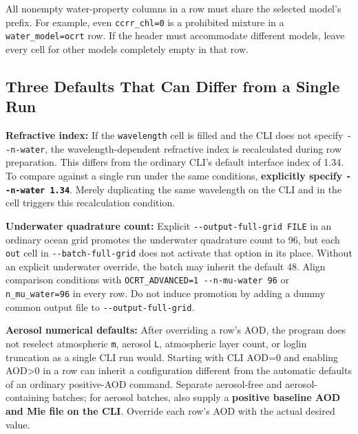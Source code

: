 All nonempty water-property columns in a row must share the selected model's prefix. For example, even \texttt{ccrr\_\allowbreak{}chl=\allowbreak{}0} is a prohibited mixture in a \texttt{water\_\allowbreak{}model=\allowbreak{}ocrt} row. If the header must accommodate different models, leave every cell for other models completely empty in that row.

\subsection{Three Defaults That Can Differ from a Single Run}
\label{sec:auto:08_input_formats:2.4}
\textbf{Refractive index:} If the \texttt{wavelength} cell is filled and the CLI does not specify \texttt{-\allowbreak{}-\allowbreak{}n-\allowbreak{}water}, the wavelength-dependent refractive index is recalculated during row preparation. This differs from the ordinary CLI's default interface index of 1.34. To compare against a single run under the same conditions, \textbf{explicitly specify \texttt{-\allowbreak{}-\allowbreak{}n-\allowbreak{}water 1.\allowbreak{}34}}. Merely duplicating the same wavelength on the CLI and in the cell triggers this recalculation condition.

\textbf{Underwater quadrature count:} Explicit \texttt{-\allowbreak{}-\allowbreak{}output-\allowbreak{}full-\allowbreak{}grid FILE} in an ordinary ocean grid promotes the underwater quadrature count to 96, but each \texttt{out} cell in \texttt{-\allowbreak{}-\allowbreak{}batch-\allowbreak{}full-\allowbreak{}grid} does not activate that option in its place. Without an explicit underwater override, the batch may inherit the default 48. Align comparison conditions with \texttt{OCRT\_\allowbreak{}ADVANCED=\allowbreak{}1 -\allowbreak{}-\allowbreak{}n-\allowbreak{}mu-\allowbreak{}water 96} or \texttt{n\_\allowbreak{}mu\_\allowbreak{}water=\allowbreak{}96} in every row. Do not induce promotion by adding a dummy common output file to \texttt{-\allowbreak{}-\allowbreak{}output-\allowbreak{}full-\allowbreak{}grid}.

\textbf{Aerosol numerical defaults:} After overriding a row's AOD, the program does not reselect atmospheric \texttt{m}, aerosol \texttt{L}, atmospheric layer count, or loglin truncation as a single CLI run would. Starting with CLI AOD=0 and enabling AOD>0 in a row can inherit a configuration different from the automatic defaults of an ordinary positive-AOD command. Separate aerosol-free and aerosol-containing batches; for aerosol batches, also supply a \textbf{positive baseline AOD and Mie file on the CLI}. Override each row's AOD with the actual desired value.

